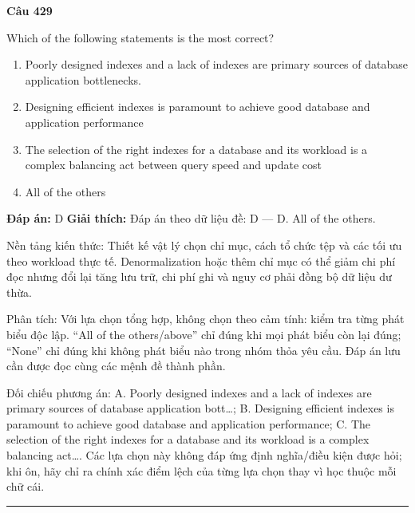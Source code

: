 \documentclass[11pt,a4paper]{article}
\newenvironment{question}[1]{%
  \par\vspace{1em}\noindent\textbf{\large Câu #1}\par\vspace{0.4em}
}{%
  \par\vspace{1em}\hrule\vspace{0.6em}
}
\newenvironment{choices}{%
  \begin{enumerate}[label=\textbf{\Alph*.},leftmargin=2.2em,itemsep=2pt,topsep=3pt]
}{%
  \end{enumerate}
}
\newcommand{\choice}{\item}
\begin{document}
\begin{question}{429}
Which of the following statements is the most correct?
\begin{choices}
\choice Poorly designed indexes and a lack of indexes are primary sources of database application bottlenecks.
\choice Designing efficient indexes is paramount to achieve good database and application performance
\choice The selection of the right indexes for a database and its workload is a complex balancing act between query speed and update cost
\choice All of the others
\end{choices}
\textbf{Đáp án:} D
\textbf{Giải thích:} Đáp án theo dữ liệu đề: D — D. All of the others.

Nền tảng kiến thức: Thiết kế vật lý chọn chỉ mục, cách tổ chức tệp và các tối ưu theo workload thực tế. Denormalization hoặc thêm chỉ mục có thể giảm chi phí đọc nhưng đổi lại tăng lưu trữ, chi phí ghi và nguy cơ phải đồng bộ dữ liệu dư thừa.

Phân tích: Với lựa chọn tổng hợp, không chọn theo cảm tính: kiểm tra từng phát biểu độc lập. “All of the others/above” chỉ đúng khi mọi phát biểu còn lại đúng; “None” chỉ đúng khi không phát biểu nào trong nhóm thỏa yêu cầu. Đáp án lưu cần được đọc cùng các mệnh đề thành phần.

Đối chiếu phương án: A. Poorly designed indexes and a lack of indexes are primary sources of database application bott…; B. Designing efficient indexes is paramount to achieve good database and application performance; C. The selection of the right indexes for a database and its workload is a complex balancing act…. Các lựa chọn này không đáp ứng định nghĩa/điều kiện được hỏi; khi ôn, hãy chỉ ra chính xác điểm lệch của từng lựa chọn thay vì học thuộc mỗi chữ cái.
\end{question}
\end{document}
